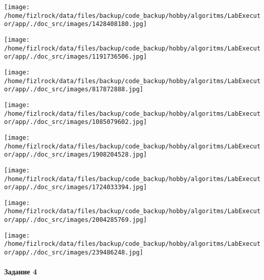 \documentclass[a4paper, 12pt]{article}
\begin{document}
\texttt{[image: /home/fizlrock/data/files/backup/code\_backup/hobby/algoritms/LabExecutor/app/./doc\_src/images/1428408180.jpg]}

\texttt{[image: /home/fizlrock/data/files/backup/code\_backup/hobby/algoritms/LabExecutor/app/./doc\_src/images/1191736506.jpg]}

\texttt{[image: /home/fizlrock/data/files/backup/code\_backup/hobby/algoritms/LabExecutor/app/./doc\_src/images/817872888.jpg]}

\texttt{[image: /home/fizlrock/data/files/backup/code\_backup/hobby/algoritms/LabExecutor/app/./doc\_src/images/1085079602.jpg]}

\texttt{[image: /home/fizlrock/data/files/backup/code\_backup/hobby/algoritms/LabExecutor/app/./doc\_src/images/1908204528.jpg]}

\texttt{[image: /home/fizlrock/data/files/backup/code\_backup/hobby/algoritms/LabExecutor/app/./doc\_src/images/1724033394.jpg]}

\texttt{[image: /home/fizlrock/data/files/backup/code\_backup/hobby/algoritms/LabExecutor/app/./doc\_src/images/2004285769.jpg]}

\texttt{[image: /home/fizlrock/data/files/backup/code\_backup/hobby/algoritms/LabExecutor/app/./doc\_src/images/239486248.jpg]}
\pagebreak
\paragraph{Задание 4}
\end{document}
